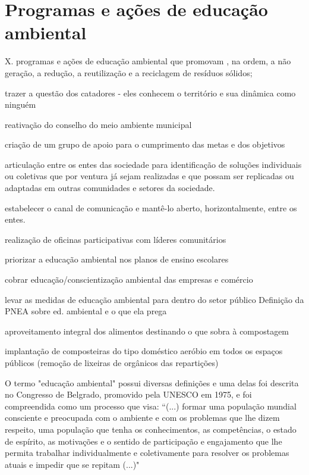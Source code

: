 \FloatBarrier
\newpage
\section{Programas e ações de educação ambiental}
\label{sec:educ_amb}

X. programas e ações de educação ambiental que promovam , na ordem, a não geração, a redução, a reutilização e a reciclagem de resíduos sólidos; 

trazer a questão dos catadores - eles conhecem o território e sua dinâmica como ninguém

reativação do conselho do meio ambiente municipal

criação de um grupo de apoio para o cumprimento das metas e dos objetivos

articulação entre os entes das sociedade para identificação de soluções individuais ou coletivas que por ventura já sejam realizadas e que possam ser replicadas ou adaptadas em outras comunidades e setores da sociedade.

estabelecer o canal de comunicação e mantê-lo aberto, horizontalmente, entre os entes.

realização de oficinas participativas com líderes comunitários

priorizar a educação ambiental nos planos de ensino escolares

cobrar educação/conscientização ambiental das empresas e comércio

levar as medidas de educação ambiental para dentro do setor público
Definição da PNEA sobre ed. ambiental e o que ela prega

aproveitamento integral dos alimentos destinando o que sobra à compostagem

implantação de composteiras do tipo doméstico aeróbio em todos os espaços públicos (remoção de lixeiras de orgânicos das repartições)

\label{sec:educ_amb}
O termo "educação ambiental" possui diversas definições e uma delas foi descrita no Congresso de Belgrado, promovido pela UNESCO em 1975, e foi compreendida como um processo que visa: “(...) formar uma população mundial consciente e preocupada com o ambiente e com os problemas que lhe dizem respeito, uma população que tenha os conhecimentos, as competências, o estado de espírito, as motivações e o sentido de participação e engajamento que lhe permita trabalhar individualmente e coletivamente para resolver os problemas atuais e impedir que se repitam (...)" 

